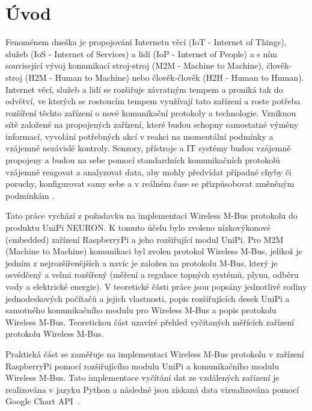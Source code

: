 \chapter*{Úvod}
{}

Fenoménem dneška je propojování Internetu věcí (IoT - Internet of Things), služeb (IoS - Internet of Services) a lidí (IoP - Internet of People) a s ním související vývoj komunikací stroj-stroj (M2M - Machine to Machine), člověk-stroj (H2M - Human to Machine) nebo člověk-člověk (H2H - Human to Human). Internet věcí, služeb a lidí se rozšiřuje závratným tempem a proniká tak do odvětví, ve kterých se rostoucím tempem využívají tato zařízení a roste potřeba rozšíření těchto zařízení o nové komunikační protokoly a technologie. Vzniknou sítě založené na propojených zařízení, které budou schopny samostatné výměny informací, vyvolání potřebných akcí v reakci na momentální podmínky a vzájemné nezávislé kontroly. Senzory, přístroje a IT systémy budou vzájemně propojeny a budou na sebe pomocí standardních komunikačních protokolů vzájemně reagovat a analyzovat data, aby mohly předvídat případné chyby či poruchy, konfigurovat samy sebe a v reálném čase se přizpůsobovat změněným 
podmínkám \cite{uvod_prumysl_4_pdf,uvod_prumysl_4_web}.

Tato práce vychází z požadavku na implementaci Wireless M-Bus protokolu do produktu UniPi NEURON. K tomuto účelu bylo zvoleno nízkovýkonové (embedded) zařízení RaspberryPi a jeho rozšiřující modul UniPi. Pro M2M (Machine to Machine) komunikaci byl zvolen protokol Wireless M-Bus, jelikož je jedním z nejrozšířenějších a navíc je založen na protokolu M-Bus, který je osvědčený a velmi rozšířený (měření a regulace topných systémů, plynu, odběru vody a elektrické energie). V teoretické části práce jsou popsány jednotlivé rodiny jednodeskových počítačů a jejich vlastnosti, popis rozšiřujících desek UniPi a samotného komunikačního modulu pro Wireless M-Bus a popis protokolu Wireless M-Bus. Teoretickou část uzavíré přehled vyčítaných měřících zařízení protokolu Wireless M-Bus. 

Praktická část se zaměřuje na implementaci Wireless M-Bus protokolu v zařízení RaspberryPi pomocí rozšiřujícího modulu UniPi a komunikačního modulu Wireless M-Bus. Tato implementace vyčítání dat ze vzdálených zařízení je realizována v jazyku Python a následně jsou získaná data vizualizována pomocí Google Chart API~\cite{uvod_google_charts_api}.


 